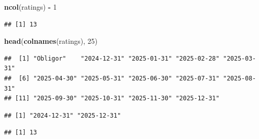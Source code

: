 \documentclass[
  11pt,
]{article}
\newenvironment{Shaded}{\begin{snugshade}}{\end{snugshade}}
\newcommand{\DecValTok}[1]{\textcolor[rgb]{0.00,0.00,0.81}{#1}}
\newcommand{\FunctionTok}[1]{\textcolor[rgb]{0.13,0.29,0.53}{\textbf{#1}}}
\newcommand{\NormalTok}[1]{#1}
\newcommand{\SpecialCharTok}[1]{\textcolor[rgb]{0.81,0.36,0.00}{\textbf{#1}}}
\begin{document}
\begin{Shaded}
\begin{Highlighting}[]
\FunctionTok{ncol}\NormalTok{(ratings) }\SpecialCharTok{{-}} \DecValTok{1}
\end{Highlighting}
\end{Shaded}

\begin{verbatim}
## [1] 13
\end{verbatim}

\begin{Shaded}
\begin{Highlighting}[]
\FunctionTok{head}\NormalTok{(}\FunctionTok{colnames}\NormalTok{(ratings), }\DecValTok{25}\NormalTok{)}
\end{Highlighting}
\end{Shaded}

\begin{verbatim}
##  [1] "Obligor"    "2024-12-31" "2025-01-31" "2025-02-28" "2025-03-31"
##  [6] "2025-04-30" "2025-05-31" "2025-06-30" "2025-07-31" "2025-08-31"
## [11] "2025-09-30" "2025-10-31" "2025-11-30" "2025-12-31"
\end{verbatim}

\begin{Shaded}
\end{Shaded}

\begin{verbatim}
## [1] "2024-12-31" "2025-12-31"
\end{verbatim}

\begin{Shaded}
\end{Shaded}

\begin{verbatim}
## [1] 13
\end{verbatim}
\end{document}
